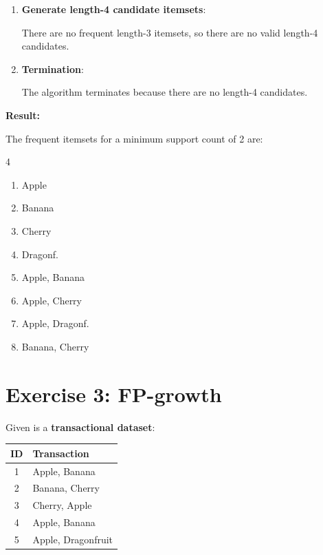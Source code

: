 \documentclass[
english,
smallborders
]{i6prcsht}
\begin{document}
\begin{solution}
\begin{enumerate}
		\item \textbf{Generate length-4 candidate itemsets}:
		      
		      There are no frequent length-3 itemsets, so there are no valid length-4 candidates.
		      
		\item \textbf{Termination}:
		      
		      The algorithm terminates because there are no length-4 candidates.
		      
	\end{enumerate}
	
	\textbf{Result:}
	
	\vspace*{-0.2cm}
	
	The frequent itemsets for a minimum support count of 2 are:
	
	\begin{multicols}{4}
		\begin{enumerate}	
			\item Apple
			\item Banana
			\item Cherry
			\item Dragonf.
			\item Apple, Banana
			\item Apple, Cherry
			\item Apple, Dragonf.
			\item Banana, Cherry
		\end{enumerate}
	\end{multicols}
\end{solution}

\section*{Exercise 3: FP-growth}

Given is a \textbf{transactional dataset}:

\begin{center}	
	\begin{tabular}{|c|l|}
		\hline
		\textbf{ID} & \textbf{Transaction} \\
		\hline
		1           & Apple, Banana        \\
		\hline
		2           & Banana, Cherry       \\
		\hline
		3           & Cherry, Apple        \\
		\hline
		4           & Apple, Banana        \\
		\hline
		5           & Apple, Dragonfruit   \\
		\hline
	\end{tabular}
\end{center}
\end{document}
